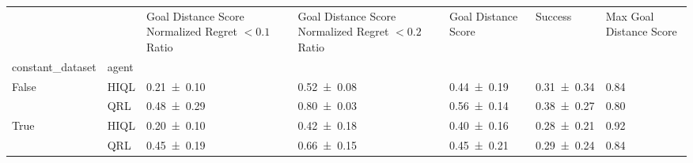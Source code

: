 \begin{tabular}{lllllll}
\toprule
 &  & Goal Distance Score Normalized Regret $< 0.1$ Ratio & Goal Distance Score Normalized Regret $< 0.2$ Ratio & Goal Distance Score & Success & Max Goal Distance Score \\
constant_dataset & agent &  &  &  &  &  \\
\midrule
\multirow[t]{2}{*}{False} & HIQL & \num{0.21 \pm 0.10} & \num{0.52 \pm 0.08} & \num{0.44 \pm 0.19} & \num{0.31 \pm 0.34} & 0.84 \\
 & QRL & \num{0.48 \pm 0.29} & \num{0.80 \pm 0.03} & \num{0.56 \pm 0.14} & \num{0.38 \pm 0.27} & 0.80 \\
\cline{1-7}
\multirow[t]{2}{*}{True} & HIQL & \num{0.20 \pm 0.10} & \num{0.42 \pm 0.18} & \num{0.40 \pm 0.16} & \num{0.28 \pm 0.21} & 0.92 \\
 & QRL & \num{0.45 \pm 0.19} & \num{0.66 \pm 0.15} & \num{0.45 \pm 0.21} & \num{0.29 \pm 0.24} & 0.84 \\
\cline{1-7}
\bottomrule
\end{tabular}
